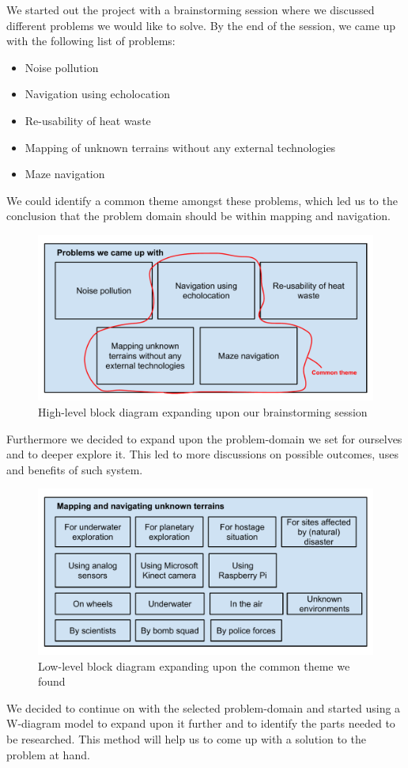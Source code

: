 We started out the project with a brainstorming session where we discussed different problems we would like to solve. By the end of the session, we came up with the following list of problems:
\begin{itemize}
	\item Noise pollution
	\item Navigation using echolocation
	\item Re-usability of heat waste
	\item Mapping of unknown terrains without any external technologies
	\item Maze navigation
\end{itemize}

We could identify a common theme amongst these problems, which led us to the conclusion that the problem domain should be within mapping and navigation. 

\begin{figure}[!h]
	\centering
	\includegraphics[scale=.7]{images/high-level-block.pdf}
	\caption{High-level block diagram expanding upon our brainstorming session}
	\label{fig:highlevelblock}
\end{figure}

Furthermore we decided to expand upon the problem-domain we set for ourselves and to deeper explore it. This led to more discussions on possible outcomes, uses and benefits of such system.

\begin{figure}[!h]
	\centering
	\includegraphics[scale=.7]{images/low-level-block.pdf}
	\caption{Low-level block diagram expanding upon the common theme we found}
	\label{fig:lowlevelblock}
\end{figure}

We decided to continue on with the selected problem-domain and started using a W-diagram model to expand upon it further and to identify the parts needed to be researched. This method will help us to come up with a solution to the problem at hand.